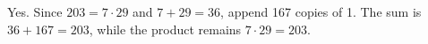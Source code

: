 Yes. Since $203=7\cdot29$ and $7+29=36$, append 167 copies of 1. The sum is $36+167=203$, while the product remains $7\cdot29=203$.
